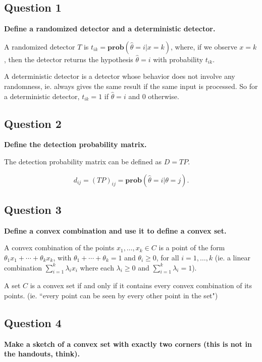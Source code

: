 
\subsection*{Question 1}
\textbf{Deﬁne a randomized detector and a deterministic detector.}

A randomized detector $T$ is $t_{ik} = \textbf{prob}(\hat \theta = i | x = k)$, where, if we observe $x=k$, then the detector returns the hypothesis $\hat \theta = i$ with probability $t_{ik}$. 

A deterministic detector is a detector whose behavior does not involve any randomness, ie. always gives the same result if the same input is processed. So for a deterministic detector, $t_{ik} = 1$ if $\hat \theta = i$ and $0$ otherwise.


\subsection*{Question 2}
\textbf{Define the detection probability matrix.}

The detection probability matrix can be defined as $D = TP$. 

$$
d_{ij} = (TP)_{ij} = \textbf{prob}(\hat \theta = i | \theta = j).
$$

\subsection*{Question 3}
\textbf{Deﬁne a convex combination and use it to deﬁne a convex set.}

A convex combination of the points $x_1, \dots, x_k \in C$ is a point of the form $\theta_1 x_1 + \cdots+ \theta_k x_k$, with $\theta_1 + \cdots+\theta_k = 1$ and $\theta_i\ge 0$, for all $i = 1,\dots, k$ (ie. a linear combination \( \sum_{i=1}^k \lambda_i x_i \) where each \( \lambda_i \geq 0 \) and \( \sum_{i=1}^k \lambda_i = 1 \)).

A set $C$ is a convex set if and only if it contains every convex combination of its points. (ie. ``every point can be seen by every other point in the set")

\subsection*{Question 4}
\textbf{Make a sketch of a convex set with exactly two corners (this is not in the handouts, think).}

